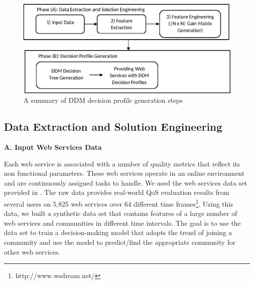 \begin{figure}%
\centerline{\includegraphics[width=5.25in]{figures/steps.eps}}
\caption{A summary of DDM decision profile generation steps}
\label{fig_steps}
\end{figure}

\subsection{Data Extraction and Solution Engineering}\label{ss:learningdata}

\bigskip
\noindent \textbf{A. Input Web Services Data}\label{sss:webservices}

Each web service is associated with a number of quality metrics that reflect its non functional parameters. These web services operate in an online environment and are continuously assigned tasks to handle. %
We used the web services data set provided in \cite{10.1109/ISSRE.2011.17}. The raw data provides real-world QoS evaluation results from several users on 5,825 web services over 64 different time frames\footnote{http://www.wsdream.net/}. %
Using this data, we built a synthetic data set that contains features of a large number of web services and communities in different time intervals. The goal is to use the data set to train a decision-making model that adopts the trend of joining a community and use the model to predict/find the appropriate community for other web services. %

